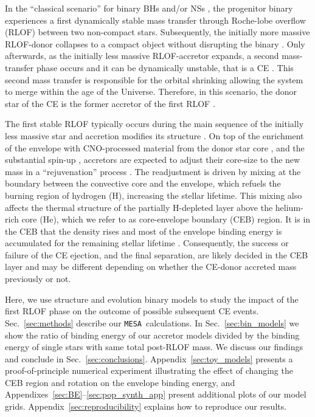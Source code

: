 \documentclass[twocolumn,twocolappendix,trackchanges]{aastex63}
\newcommand{\code}[1]{\texttt{#1}}
\newcommand{\mesa}{\code{MESA}}
\DeclareRobustCommand{\Secref}[1]{Sec.~\ref{#1}}
\begin{document}
In the ``classical scenario'' for binary BHs and/or NSs
\citep[e.g.,][]{tutukov:93,belczynski:2016, tauris:2017}, the
progenitor binary experiences a first dynamically stable mass transfer
through Roche-lobe overflow (RLOF) between two non-compact stars.
Subsequently, the initially more massive RLOF-donor collapses to a
compact object without disrupting the binary
\citep[e.g.,][]{blaauw:1961,renzo:2019walk}. Only afterwards, as the
initially less massive RLOF-accretor expands, a second mass-transfer
phase occurs and it can be dynamically unstable, that is a CE
\citep[e.g.,][]{dominik:2012, belczynski:2016, kruckow:18}. This
second mass transfer is responsible for the orbital shrinking
\citep{paczynski:1976} allowing the system to merge within the age of
the Universe. Therefore, in this scenario, the donor star of the CE is
the former accretor of the first RLOF \citep[e.g.,][]{klencki:2020,
  law-smith:2020, renzo:2021zoph}.

The first stable RLOF typically occurs during the main sequence of the
initially less massive star and accretion modifies its structure
\citep[e.g.,][]{neo:1977, packet:1981, blaauw:1993, cantiello:2007,
  renzo:2021zoph}. On top of the enrichment of the envelope with
CNO-processed material from the donor star core \citep{blaauw:1993,
  renzo:2021zoph, el-badry:2022a}, and the substantial spin-up \citep[e.g.,][]{packet:1981},
accretors are expected to adjust their core-size to the new mass in a
``rejuvenation'' process \citep[e.g.,][]{neo:1977, hellings:1983,
  hellings:1984}. The readjustment is driven by mixing at the boundary
between the convective core and the envelope, which refuels the
burning region of hydrogen (H), increasing the stellar lifetime. This
mixing also affects the thermal structure of the partially H-depleted
layer above the helium-rich core (He), which we refer to as
core-envelope boundary (CEB) region. It is in the CEB that the density
rises and most of the envelope binding energy is accumulated for the
remaining stellar lifetime \citep[e.g.,][]{tauris:01, ivanova:2013,
  ivanova:2020}. Consequently, the success or failure of the CE
ejection, and the final separation, are likely decided in the CEB
layer and may be different depending on whether the CE-donor accreted
mass previously or not.

Here, we use structure and evolution binary models to study the impact
of the first RLOF phase on the outcome of possible subsequent CE
events. \Secref{sec:methods} describe our \mesa\ calculations. In
\Secref{sec:bin_models} we show the ratio of binding energy of our
accretor models divided by the binding energy of single stars with same
total post-RLOF mass. We discuss our findings and conclude in
\Secref{sec:conclusions}. Appendix~\ref{sec:toy_models} presents a
proof-of-principle numerical experiment illustrating the effect of
changing the CEB region and rotation on the envelope binding energy,
and Appendixes~\ref{sec:BE}--\ref{sec:pop_synth_app} present
additional plots of our model grids.
Appendix~\ref{sec:reproducibility} explains how to reproduce our
results.
\end{document}
